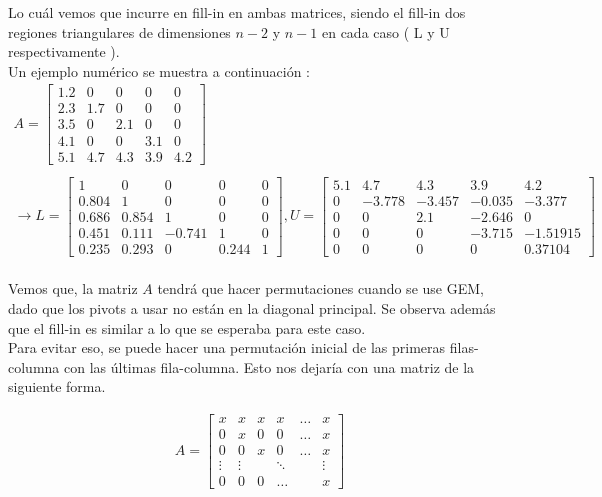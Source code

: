\documentclass{article}
\begin{document}
\begin{enumerate}
Lo cu\'al vemos que incurre en fill-in en ambas matrices, siendo el fill-in dos regiones triangulares de dimensiones $n-2$ y $n-1$ en cada caso ( L y U respectivamente ).
\\
Un ejemplo num\'erico se muestra a continuaci\'on :
\begin{gather*}
A =
\begin{bmatrix}
   1.2  &    0    &  0   &  0   &  0 \\
   2.3  &   1.7   &  0   &  0   &  0 \\
   3.5  &    0    &  2.1 &  0   &  0 \\
   4.1  &    0    &  0   &  3.1 &  0 \\
   5.1  &   4.7   &  4.3 &  3.9 &  4.2
\end{bmatrix}\\\\
\rightarrow
L = 
\begin{bmatrix}
       1   &     0    &     0  &    0   &  0 \\
     0.804 &     1    &     0  &    0   &  0 \\
     0.686 &   0.854  &     1  &    0   &  0 \\
     0.451 &   0.111  & -0.741 &    1   &  0 \\
     0.235 &   0.293  &  	0  &  0.244 &  1
\end{bmatrix},
U = 
\begin{bmatrix}
   5.1 &  4.7	&  4.3 	 &  3.9     &  4.2     \\
    0  & -3.778 & -3.457 & -0.035   & -3.377   \\
    0  &    0   &  2.1   & -2.646   &  0       \\
    0  &  	0	&   0    & -3.715   & -1.51915 \\
    0  &  	0   &   0    &   0  	&  0.37104
\end{bmatrix}
\end{gather*}
\\
Vemos que, la matriz $A$ tendr\'a que hacer permutaciones cuando se use GEM, dado que los pivots a usar no est\'an en la diagonal principal. Se observa adem\'as que el fill-in es similar a lo que se esperaba para este caso.
\\
Para evitar eso, se puede hacer una permutaci\'on inicial de las primeras filas-columna con las \'ultimas fila-columna. Esto nos dejar\'ia con una matriz de la siguiente forma.

\begin{gather*}
A = 
	\begin{bmatrix}
		x & x & x & x & \hdots & x \\
		0 & x & 0 & 0 & \hdots & x \\
		0 & 0 & x & 0 & \hdots & x \\
		\vdots & \vdots && \ddots && \vdots \\
		0 & 0 & 0 & \hdots && x
	\end{bmatrix}
\end{gather*}


\end{enumerate}
\end{document}
